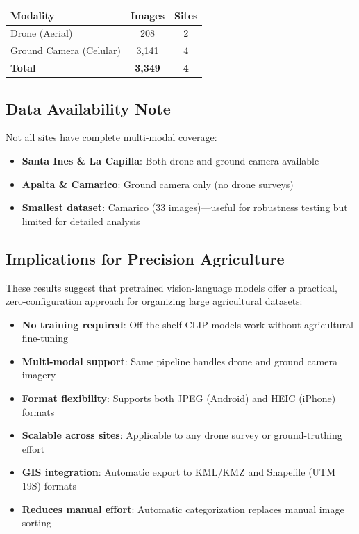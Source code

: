 \begin{center}
\begin{tabular}{lcc}
\toprule
\textbf{Modality} & \textbf{Images} & \textbf{Sites} \\
\midrule
Drone (Aerial) & 208 & 2 \\
Ground Camera (Celular) & 3,141 & 4 \\
\midrule
\textbf{Total} & \textbf{3,349} & \textbf{4} \\
\bottomrule
\end{tabular}
\end{center}

\subsection*{Data Availability Note}

Not all sites have complete multi-modal coverage:
\begin{itemize}
    \item \textbf{Santa Ines \& La Capilla}: Both drone and ground camera available
    \item \textbf{Apalta \& Camarico}: Ground camera only (no drone surveys)
    \item \textbf{Smallest dataset}: Camarico (33 images)---useful for robustness testing but limited for detailed analysis
\end{itemize}

\subsection*{Implications for Precision Agriculture}

These results suggest that pretrained vision-language models offer a practical, zero-configuration approach for organizing large agricultural datasets:

\begin{itemize}
    \item \textbf{No training required}: Off-the-shelf CLIP models work without agricultural fine-tuning
    \item \textbf{Multi-modal support}: Same pipeline handles drone and ground camera imagery
    \item \textbf{Format flexibility}: Supports both JPEG (Android) and HEIC (iPhone) formats
    \item \textbf{Scalable across sites}: Applicable to any drone survey or ground-truthing effort
    \item \textbf{GIS integration}: Automatic export to KML/KMZ and Shapefile (UTM 19S) formats
    \item \textbf{Reduces manual effort}: Automatic categorization replaces manual image sorting
\end{itemize}

